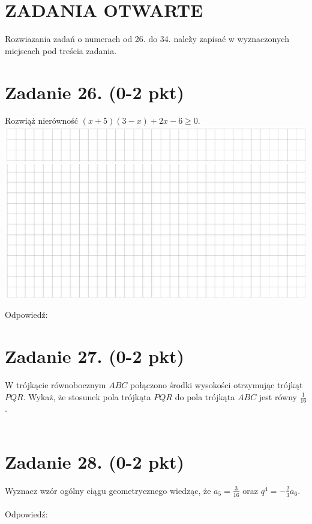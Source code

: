 \documentclass[10pt]{article}
\begin{document}
\section*{ZADANIA OTWARTE}
Rozwiazania zadań o numerach od 26. do 34. należ̀y zapisać w wyznaczonych miejscach pod treścia zadania.

\section*{Zadanie 26. (0-2 pkt)}
Rozwiąż nierówność \((x+5)(3-x)+2 x-6 \geq 0\).\\
\includegraphics[max width=\textwidth, center]{2024_11_21_b8ac5f500a5bbb1b4ec5g-12}\\
\includegraphics[max width=\textwidth, center]{2024_11_21_b8ac5f500a5bbb1b4ec5g-12(1)}

Odpowiedź:

\section*{Zadanie 27. (0-2 pkt)}
W trójkącie równobocznym \(A B C\) połączono środki wysokości otrzymując trójkąt \(P Q R\). Wykaż, że stosunek pola trójkąta \(P Q R\) do pola trójkąta \(A B C\) jest równy \(\frac{1}{16}\).\\
\(\qquad\)

\section*{Zadanie 28. (0-2 pkt)}
Wyznacz wzór ogólny ciągu geometrycznego wiedząc, że \(a_{5}=\frac{3}{16}\) oraz \(q^{4}=-\frac{2}{3} a_{6}\).\\
\(\qquad\)\\
Odpowiedź:
\end{document}
